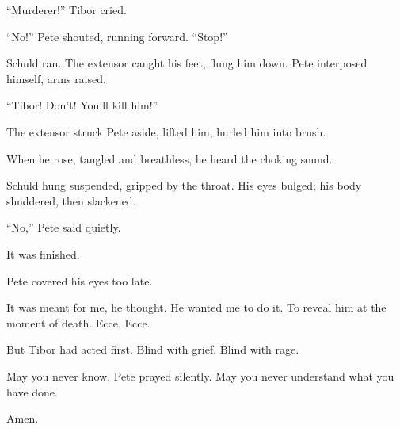 “Murderer!” Tibor cried.

“No!” Pete shouted, running forward. “Stop!”

Schuld ran. The extensor caught his feet, flung him down. Pete interposed himself, arms raised.

“Tibor! Don’t! You’ll kill him!”

The extensor struck Pete aside, lifted him, hurled him into brush.

When he rose, tangled and breathless, he heard the choking sound.

Schuld hung suspended, gripped by the throat. His eyes bulged; his body shuddered, then slackened.

“No,” Pete said quietly.

It was finished.

Pete covered his eyes too late.

It was meant for me, he thought. He wanted me to do it. To reveal him at the moment of death. Ecce. Ecce.

But Tibor had acted first. Blind with grief. Blind with rage.

May you never know, Pete prayed silently. May you never understand what you have done.

Amen.

